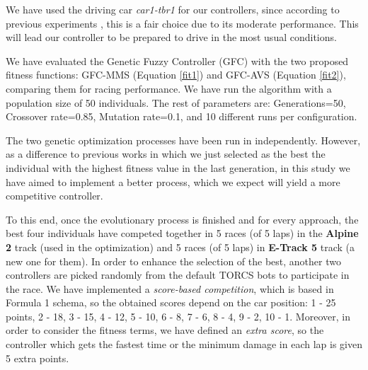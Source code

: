 \documentclass[conference]{IEEEtran}
\begin{document}
We have used the driving car  \textit{car1-tbr1} for our controllers, since according to previous experiments \cite{evo17}, this is a fair choice due to its moderate performance. This will lead our controller to be prepared to drive in the most usual conditions. 

We have evaluated the Genetic Fuzzy Controller (GFC) with the two proposed fitness functions: GFC-MMS (Equation \ref{fit1}) and GFC-AVS (Equation \ref{fit2}), comparing them for racing performance. We have run the algorithm with a population size of 50 individuals. The rest of parameters are: Generations=50, Crossover rate=0.85, Mutation rate=0.1, and 10 different runs per configuration.



The two genetic optimization processes have been run in independently. However, as a difference to previous works in which we just selected as the best the individual with the highest fitness value in the last generation, in this study we have aimed to implement a better process, which we expect will yield a more competitive controller.

To this end, once the evolutionary process is finished and for every approach, the best four individuals have competed together in 5 races (of 5 laps) in the \textbf{Alpine 2} track (used in the optimization) and 5 races (of 5 laps) in \textbf{E-Track 5} track (a new one for them). 
In order to enhance the selection of the best, another two controllers are picked randomly from the default TORCS bots to participate in the race. 
We have implemented a \textit{score-based competition}, which is based in Formula 1 schema, so the obtained scores depend on the car position: 1 - 25 points, 2 - 18, 3 - 15, 4 - 12, 5 - 10, 6 - 8, 7 - 6, 8 - 4, 9 - 2, 10 - 1.
Moreover, in order to consider the fitness terms, we have defined an \textit{extra score}, so the controller which gets the fastest time or the minimum damage in each lap is given 5 extra points.
\end{document}
